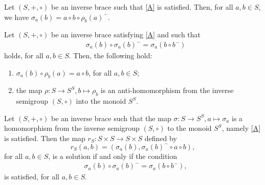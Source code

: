 \documentclass[10pt,a4paper]{amsart}
\begin{document}
\begin{lemma}\label{sigma_rho}
Let $(S,+,\circ)$ be an inverse brace such that \eqref{A} is satisfied. Then, for all $a, b \in S$, we have $\sigma_a(b)=a \circ b \circ \rho_b(a)^-.$
\end{lemma}

\begin{prop}\label{condizione_a_2}
  Let $(S, +, \circ)$ be an inverse brace satisfying \eqref{A} and such that \begin{align}
    &\sigma_a(b)\circ \sigma_a(b)^-=\sigma_a\left(b \circ b^-\right) 
    \tag{II}\label{B}
    \end{align}
    holds, for all $a, b \in S$. Then, the following hold:
    \begin{enumerate}
        \item[\rm{(1)}] $\sigma_a(b)\circ \rho_b(a)=a \circ b$, for all $a, b \in S$;
        \item[\rm{(2)}] the map $\rho: S \to S^S, b \mapsto \rho_b$
    is an anti-homomorphism from the inverse semigroup $(S, \circ)$ into the monoid $S^S$.
    \end{enumerate}
\end{prop}

\begin{theor}\label{teo_solu}
  Let $(S, +, \circ)$ be an inverse brace such that the map $\sigma: S \to S^S, a \mapsto \sigma_a$ is a homomorphism from the inverse semigroup $(S, \circ)$ to the monoid $S^S$, namely \eqref{A} is satisfied. Then the map $r_S:S \times S\to S\times S$ defined by $$r_S(a,b)=\left(\sigma_a(b), \sigma_a(b)^- \circ a \circ b\right),$$
 for all $a, b \in S$, is a solution if and only if the condition
    \begin{align}
    &\sigma_a(b)\circ \sigma_a(b)^-=\sigma_a\left(b \circ b^-\right), 
    \tag{II}
    \end{align}
    is satisfied, for all $a, b \in S$.
\end{theor}
\end{document}
